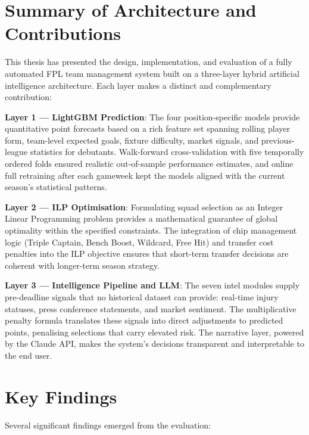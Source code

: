 
\section{Summary of Architecture and Contributions}

This thesis has presented the design, implementation, and evaluation of a fully automated FPL team management system built on a three-layer hybrid artificial intelligence architecture. Each layer makes a distinct and complementary contribution:

\textbf{Layer 1 — LightGBM Prediction}: The four position-specific models provide quantitative point forecasts based on a rich feature set spanning rolling player form, team-level expected goals, fixture difficulty, market signals, and previous-league statistics for debutants. Walk-forward cross-validation with five temporally ordered folds ensured realistic out-of-sample performance estimates, and online full retraining after each gameweek kept the models aligned with the current season's statistical patterns.

\textbf{Layer 2 — ILP Optimisation}: Formulating squad selection as an Integer Linear Programming problem provides a mathematical guarantee of global optimality within the specified constraints. The integration of chip management logic (Triple Captain, Bench Boost, Wildcard, Free Hit) and transfer cost penalties into the ILP objective ensures that short-term transfer decisions are coherent with longer-term season strategy.

\textbf{Layer 3 — Intelligence Pipeline and LLM}: The seven intel modules supply pre-deadline signals that no historical dataset can provide: real-time injury statuses, press conference statements, and market sentiment. The multiplicative penalty formula translates these signals into direct adjustments to predicted points, penalising selections that carry elevated risk. The narrative layer, powered by the Claude API, makes the system's decisions transparent and interpretable to the end user.

\section{Key Findings}

Several significant findings emerged from the evaluation:

